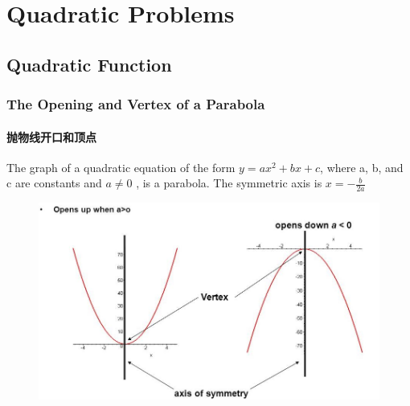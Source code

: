 \documentclass[
	11pt, %
	handout,
]{beamer}
\begin{document}

\section{Quadratic Problems}


\subsection{Quadratic Function}



\begin{frame}
	\frametitle{The Opening and Vertex of a Parabola}
	\framesubtitle{抛物线开口和顶点}
			\begin{definition}
		The graph of a quadratic equation of the form $y = ax^2 + bx +c $, where a, b, and c are constants and $a\neq 0$ , is a \alert{parabola}. The symmetric axis is  $x= -\frac{b}{2a}$
			\end{definition}

			\begin{figure}
				\includegraphics[width=0.6\linewidth]{Parabola.jpeg}
			\end{figure}

\end{frame}

\end{document}
